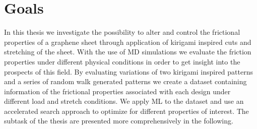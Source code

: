 \section{Goals} %
In this thesis we investigate the possibility to alter and control the frictional
properties of a graphene sheet through application of kirigami inspired cuts and stretching of the sheet. With the use of \acrshort{MD} simulations we evaluate the friction properties under different physical conditions in order to get insight into the prospects of this field. By evaluating variations of two kirigami inspired patterns and a series of random walk generated patterns we create a dataset containing information of the frictional properties associated with each design under different load and stretch conditions. We apply \acrshort{ML} to the dataset and use an accelerated search approach to optimize for different properties of interest. The subtask of the thesis are presented more comprehensively in the following.
